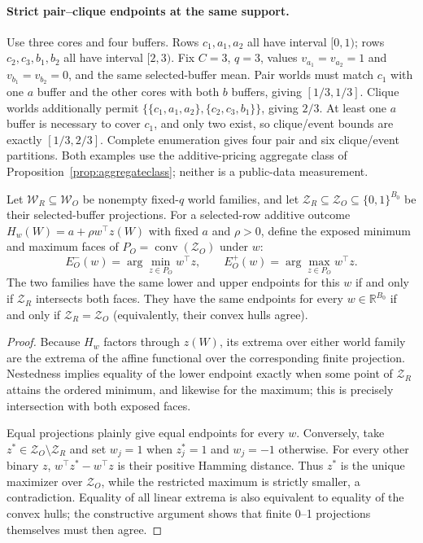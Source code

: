 \paragraph{Strict pair--clique endpoints at the same support.}
Use three cores and four buffers. Rows $c_1,a_1,a_2$ all have interval
$[0,1)$; rows $c_2,c_3,b_1,b_2$ all have interval $[2,3)$.
Fix $C=3$, $q=3$, values $v_{a_1}=v_{a_2}=1$ and $v_{b_1}=v_{b_2}=0$,
and the same selected-buffer mean. Pair worlds must match $c_1$ with one
$a$ buffer and the other cores with both $b$ buffers, giving $[1/3,1/3]$.
Clique worlds additionally permit $\{\{c_1,a_1,a_2\},\{c_2,c_3,b_1\}\}$,
giving $2/3$. At least one $a$ buffer is necessary to cover $c_1$, and only
two exist, so clique/event bounds are exactly $[1/3,2/3]$.
Complete enumeration gives four pair and six clique/event partitions.
Both examples use the additive-pricing aggregate class of
Proposition~\ref{prop:aggregateclass}; neither is a public-data measurement.

\begin{proposition}
\label{prop:projectionfrontier}
Let $\mathcal W_R\subseteq\mathcal W_O$ be nonempty fixed-$q$ world families,
and let $\mathcal Z_R\subseteq\mathcal Z_O\subseteq\{0,1\}^{B_0}$ be their
selected-buffer projections. For a selected-row additive outcome
$H_w(W)=a+\rho w^\top z(W)$ with fixed $a$ and $\rho>0$, define the exposed
minimum and maximum faces of $P_O=\operatorname{conv}(\mathcal Z_O)$ under
$w$:
\[
 E_O^-(w)=\arg\min_{z\in P_O}w^\top z,
 \qquad E_O^+(w)=\arg\max_{z\in P_O}w^\top z.
\]
The two families have the same lower and upper endpoints for this $w$ if
and only if $\mathcal Z_R$ intersects both faces. They have the same endpoints
for every $w\in\mathbb R^{B_0}$ if and only if
$\mathcal Z_R=\mathcal Z_O$ (equivalently, their convex hulls agree).
\end{proposition}
\begin{proof}
Because $H_w$ factors through $z(W)$, its extrema over either world family are
the extrema of the affine functional over the corresponding finite projection.
Nestedness implies equality of the lower endpoint exactly when some point of
$\mathcal Z_R$ attains the ordered minimum, and likewise for the maximum; this
is precisely intersection with both exposed faces.

Equal projections plainly give equal endpoints for every $w$. Conversely,
take $z^*\in\mathcal Z_O\setminus\mathcal Z_R$ and set
$w_j=1$ when $z^*_j=1$ and $w_j=-1$ otherwise. For every other binary $z$,
$w^\top z^*-w^\top z$ is their positive Hamming distance. Thus $z^*$ is the
unique maximizer over $\mathcal Z_O$, while the restricted maximum is strictly
smaller, a contradiction. Equality of all linear extrema is also equivalent
to equality of the convex hulls; the constructive argument shows that finite
0--1 projections themselves must then agree.
\end{proof}

